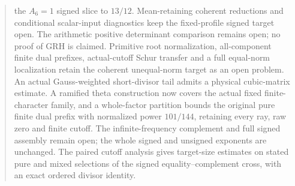 \begin{abstract}
the $A_6=1$ signed slice to $13/12$. Mean-retaining coherent reductions and conditional scalar-input diagnostics keep the fixed-profile signed target open. The arithmetic positive determinant comparison remains open; no proof of GRH is claimed. Primitive root normalization, all-component finite dual prefixes, actual-cutoff Schur transfer and a full equal-norm localization retain the coherent unequal-norm target as an open problem. An actual Gauss-weighted short-divisor tail admits a physical cubic-matrix estimate. A ramified theta construction now covers the actual fixed finite-character family, and a whole-factor partition bounds the original pure finite dual prefix with normalized power $101/144$, retaining every ray, raw zero and finite cutoff. The infinite-frequency complement and full signed assembly remain open; the whole signed and unsigned exponents are unchanged.
 The paired cutoff analysis gives target-size estimates on stated pure and mixed selections of the signed equality--complement cross, with an exact ordered divisor identity.
\end{abstract}
{\small\tableofcontents}









































